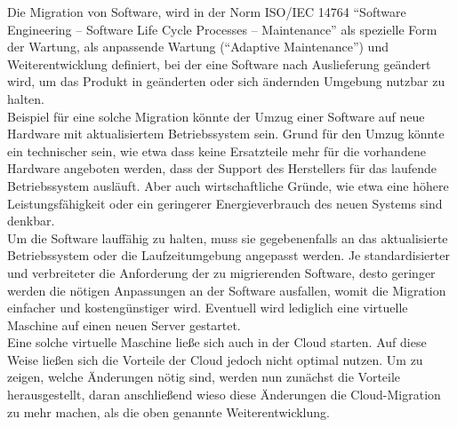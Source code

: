 Die Migration von Software, wird in der Norm ISO/IEC 14764 "`Software 
Engineering -- Software Life Cycle Processes -- Maintenance"' als spezielle 
Form der Wartung, als anpassende Wartung ("`Adaptive Maintenance"') und 
Weiterentwicklung definiert, bei der eine Software nach Auslieferung geändert 
wird, um das Produkt in geänderten oder sich ändernden Umgebung nutzbar zu 
halten.  \\ 
Beispiel für eine solche Migration könnte der Umzug einer Software auf neue 
Hardware mit aktualisiertem Betriebssystem sein. Grund für den Umzug könnte ein 
technischer sein, wie etwa dass keine Ersatzteile mehr für die vorhandene 
Hardware angeboten werden, dass der Support des Herstellers für das laufende 
Betriebssystem ausläuft. Aber auch wirtschaftliche Gründe, wie etwa eine höhere 
Leistungsfähigkeit oder ein geringerer Energieverbrauch des neuen Systems sind 
denkbar. \\
Um die Software lauffähig zu halten, muss sie 
gegebenenfalls an das aktualisierte Betriebssystem oder die Laufzeitumgebung 
angepasst werden. Je standardisierter und verbreiteter die Anforderung der zu 
migrierenden Software, desto geringer werden die nötigen Anpassungen an der 
Software ausfallen, womit die Migration einfacher und kostengünstiger wird. 
Eventuell wird lediglich eine virtuelle Maschine auf einen neuen Server 
gestartet. \\

Eine solche virtuelle Maschine ließe sich auch in der Cloud starten. Auf 
diese Weise ließen sich die Vorteile der Cloud jedoch nicht optimal nutzen. Um 
zu zeigen, welche Änderungen nötig sind, werden nun zunächst die Vorteile 
herausgestellt, daran anschließend wieso diese Änderungen die Cloud-Migration 
zu mehr machen, als die oben genannte Weiterentwicklung. 


